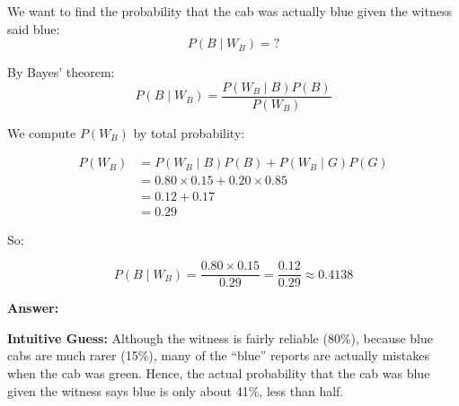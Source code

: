 \documentclass[11pt]{article}
\begin{document}
We want to find the probability that the cab was actually blue given the witness said blue:
\[
P(B \mid W_B) = ?
\]

By Bayes’ theorem:
\[
P(B \mid W_B) = \frac{P(W_B \mid B) P(B)}{P(W_B)}
\]

We compute $P(W_B)$ by total probability:

\begin{align*}
  P(W_B) &= P(W_B \mid B) P(B) + P(W_B \mid G) P(G) \\
         &= 0.80 \times 0.15 + 0.20 \times 0.85 \\
         &= 0.12 + 0.17 \\
         &= 0.29
\end{align*}

So:

\[
P(B \mid W_B) = \frac{0.80 \times 0.15}{0.29} = \frac{0.12}{0.29} \approx 0.4138
\]

\noindent
\textbf{Answer:} 

\noindent
\textbf{Intuitive Guess:} Although the witness is fairly reliable (80\%), because blue cabs are much rarer (15\%), many of the “blue” reports are actually mistakes when the cab was green. Hence, the actual probability that the cab was blue given the witness says blue is only about 41\%, less than half.
\fi
\end{document}
